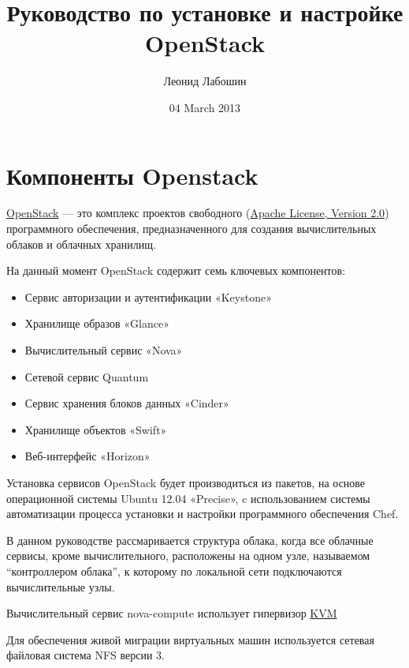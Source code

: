 \documentclass[letterpaper,10pt,russian]{sphinxmanual}
\title{Руководство по установке и настройке OpenStack}
\date{04 March 2013}
\author{Леонид Лабошин}
\begin{document}
\maketitle
\tableofcontents
{}\label{index::doc}



\chapter{Компоненты Openstack}
\label{index:openstack}\label{index:openstack-folsom}
\href{http://www.openstack.org/}{OpenStack} — это комплекс проектов свободного (\href{http://www.apache.org/licenses/LICENSE-2.0}{Apache License, Version 2.0}) программного обеспечения, предназначенного для создания вычислительных облаков и облачных хранилищ.

На данный момент OpenStack содержит семь ключевых компонентов:
\begin{itemize}
\item {} 
Сервис авторизации и аутентификации «Keystone»

\item {} 
Хранилище образов «Glance»

\item {} 
Вычислительный сервис «Nova»

\item {} 
Сетевой сервис Quantum

\item {} 
Сервис хранения блоков данных «Cinder»

\item {} 
Хранилище объектов «Swift»

\item {} 
Веб-интерфейс «Horizon»

\end{itemize}

Установка сервисов OpenStack будет производиться из пакетов, на основе операционной системы Ubuntu 12.04 «Precise», c использованием системы автоматизации процесса установки и настройки программного обеспечения Chef.

В данном руководстве рассмаривается структура облака, когда все облачные сервисы, кроме вычислительного, расположены на одном узле, называемом ``контроллером облака'', к которому по локальной сети подключаются вычислительные узлы.

Вычислительный сервис nova-compute использует гипервизор \href{http://www.linux-kvm.org/page/Main\_Page}{KVM}

Для обеспечения живой миграции виртуальных машин используется сетевая файловая система NFS версии 3.
\end{document}
